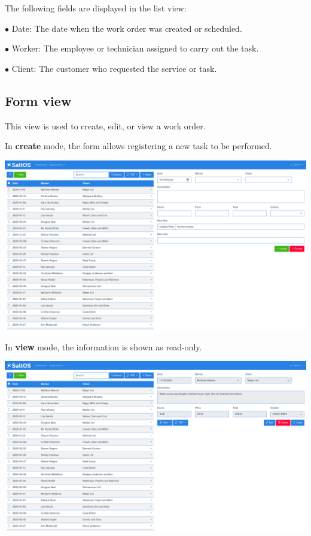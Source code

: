 \documentclass[a4paper]{article}
\begin{document}
The following fields are displayed in the list view:

\begin{compactitem}
\item[\color{myblue}$\bullet$] Date: The date when the work order was created or scheduled.
\item[\color{myblue}$\bullet$] Worker: The employee or technician assigned to carry out the task.
\item[\color{myblue}$\bullet$] Client: The customer who requested the service or task.
\end{compactitem}

\hypertarget{toc174}{}
\subsection{Form view}

This view is used to create, edit, or view a work order.

In \textbf{create} mode, the form allows registering a new task to be performed.

\begin{center}\includegraphics[width=1\textwidth]{../ujest/snaps/test-screenshots-js-screenshots-sales-workorders-create-en-us-1-snap.png}\end{center}

In \textbf{view} mode, the information is shown as read-only.

\begin{center}\includegraphics[width=1\textwidth]{../ujest/snaps/test-screenshots-js-screenshots-sales-workorders-view-100-en-us-1-snap.png}\end{center}
\end{document}
